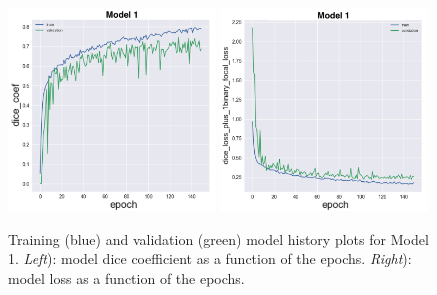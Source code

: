 \documentclass{standalone}
\begin{document}
\vfill


\begin{figure}[htp]
    \centering
    \includegraphics[width=0.49\textwidth]{../images/dice_coef1.png}
	\includegraphics[width=0.49\textwidth]{../images/loss1.png} 

    \caption{Training (blue) and validation (green) model history plots for Model 1. \textit{Left}): model dice coefficient as a function of the epochs. \textit{Right}): model loss as a function of the epochs.}
    \label{training1}
    
\end{figure}
\end{document}
